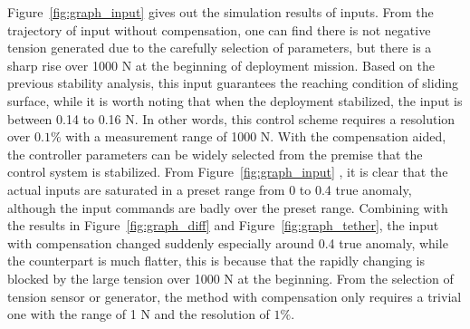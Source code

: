 \documentclass[10pt,onecolumn,draftcls]{IEEEtran}
\begin{document}
Figure~\ref{fig:graph_input} gives out the simulation results of inputs.
From the trajectory of input without compensation, one can find there is not negative tension generated due to the carefully selection of parameters, but there is a sharp rise over 1000 N at the beginning of deployment mission. Based on the previous stability analysis, this input guarantees the reaching condition of sliding surface, while it is worth noting that when the deployment stabilized, the input is between 0.14 to 0.16 N. In other words, this control scheme requires a resolution over $0.1\%$ with a measurement range of 1000 N. 
With the compensation aided, the controller parameters can be widely selected from the premise that the control system is stabilized. From Figure~\ref{fig:graph_input} , it is clear that the actual inputs are saturated in a preset range from 0 to 0.4 true anomaly, although the input commands are badly over the preset range. 
Combining with the results in Figure~\ref{fig:graph_diff} and Figure~\ref{fig:graph_tether}, the input with compensation changed suddenly especially around 0.4 true anomaly, while the counterpart is much flatter, this is because that the rapidly changing is blocked by the large tension over 1000 N at the beginning.  
From the selection of tension sensor or generator, the method with compensation only requires a trivial one with the range of 1 N and the resolution of $1\%$. 
\end{document}
